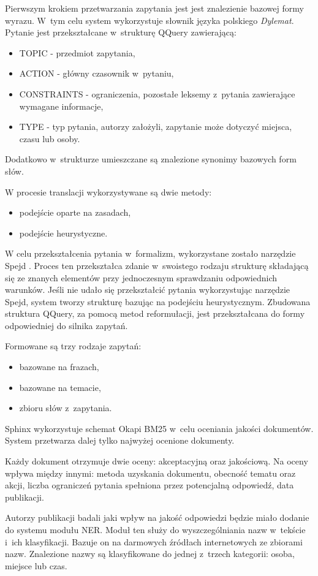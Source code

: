 Pierwszym krokiem przetwarzania zapytania jest jest znalezienie bazowej formy wyrazu. W~tym celu system wykorzystuje słownik języka polskiego \textit{Dylemat}. Pytanie jest przekształcane w~strukturę QQuery zawierającą:
\begin{itemize}
	\item TOPIC - przedmiot zapytania,
	\item ACTION - główny czasownik w~pytaniu,
	\item CONSTRAINTS - ograniczenia, pozostałe leksemy z~pytania zawierające wymagane informacje,
	\item TYPE - typ pytania, autorzy założyli, zapytanie może dotyczyć miejsca, czasu lub osoby.
\end{itemize}
Dodatkowo w~strukturze umieszczane są znalezione synonimy bazowych form słów.

W procesie translacji wykorzystywane są dwie metody: 
\begin{itemize}
	\item podejście oparte na zasadach, 
	\item podejście heurystyczne.
\end{itemize}
W celu przekształcenia pytania w~formalizm, wykorzystane zostało narzędzie Spejd \cite{spejd}. Proces ten przekształca zdanie w~swoistego rodzaju strukturę składającą się ze znanych elementów przy jednoczesnym sprawdzaniu odpowiednich warunków. Jeśli nie udało się przekształcić pytania wykorzystując narzędzie Spejd, system tworzy strukturę bazując na podejściu heurystycznym. Zbudowana struktura QQuery, za pomocą metod reformułacji, jest przekształcana do formy odpowiedniej do silnika zapytań.

Formowane są trzy rodzaje zapytań:
\begin{itemize}
	\item bazowane na frazach,
	\item bazowane na temacie,
	\item zbioru słów z~zapytania.
\end{itemize}

Sphinx wykorzystuje schemat Okapi BM25 w~celu oceniania jakości dokumentów. System przetwarza dalej tylko najwyżej ocenione dokumenty.

Każdy dokument otrzymuje dwie oceny: akceptacyjną oraz jakościową. Na oceny wpływa między innymi: metoda uzyskania dokumentu, obecność tematu oraz akcji, liczba ograniczeń pytania spełniona przez potencjalną odpowiedź, data publikacji.

Autorzy publikacji \cite{polishQAS} badali jaki wpływ na jakość odpowiedzi będzie miało dodanie do systemu modułu NER. Moduł ten służy do wyszczególniania nazw w~tekście i~ich klasyfikacji. Bazuje on na darmowych źródłach internetowych ze zbiorami nazw. Znalezione nazwy są klasyfikowane do jednej z~trzech kategorii: osoba, miejsce lub czas.

